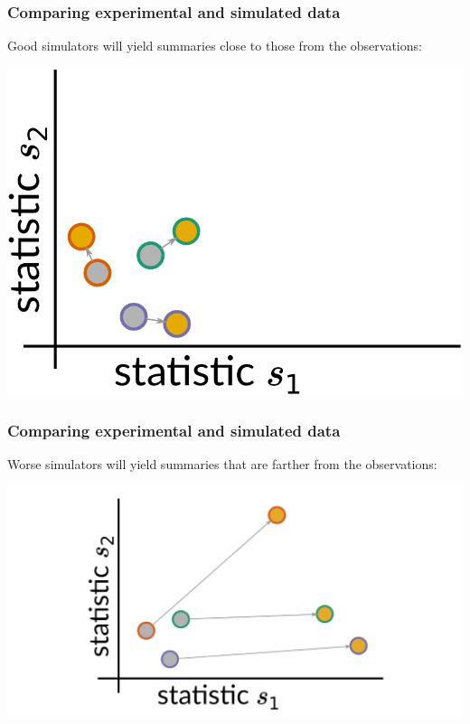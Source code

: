 \documentclass[mathserif,compress]{beamer}
\renewcommand\;{\,}
\begin{document}
\begin{frame}\frametitle{Comparing experimental and simulated data}
Good simulators will yield summaries close to those from the observations:
\begin{center}
\includegraphics[width=0.65\linewidth]{Images/paired-summary-stats.pdf}
\end{center}
\end{frame}

\begin{frame}\frametitle{Comparing experimental and simulated data}
Worse simulators will yield summaries that are farther from the observations:
\begin{center}
\includegraphics[width=\linewidth]{Images/bad-statistics.png}
\end{center}
\end{frame}
\end{document}
